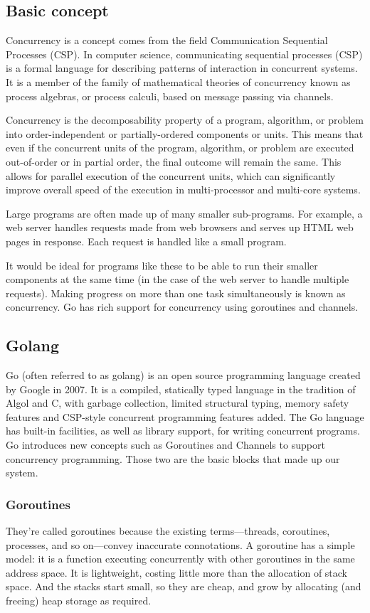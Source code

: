 \subsection{Basic concept}
Concurrency \cite{concurrency}is a concept comes from the field Communication Sequential Processes (CSP)\cite{csp}. In computer science, communicating sequential processes (CSP) is a formal language for describing patterns of interaction in concurrent systems. It is a member of the family of mathematical theories of concurrency known as process algebras, or process calculi, based on message passing via channels. 

Concurrency is the decomposability property of a program, algorithm, or problem into order-independent or partially-ordered components or units. This means that even if the concurrent units of the program, algorithm, or problem are executed out-of-order or in partial order, the final outcome will remain the same. This allows for parallel execution of the concurrent units, which can significantly improve overall speed of the execution in multi-processor and multi-core systems.

Large programs are often made up of many smaller sub-programs. For example, a web server handles requests made from web browsers and serves up HTML web pages in response. Each request is handled like a small program.

It would be ideal for programs like these to be able to run their smaller components at the same time (in the case of the web server to handle multiple requests). Making progress on more than one task simultaneously is known as concurrency. Go has rich support for concurrency using goroutines and channels.

\subsection{Golang}
Go\cite{golang} (often referred to as golang) is an open source programming language created by Google in 2007. It is a compiled, statically typed language in the tradition of Algol and C, with garbage collection, limited structural typing, memory safety features and CSP-style concurrent programming features added. The Go language has built-in facilities, as well as library support, for writing concurrent programs. Go introduces new concepts such as Goroutines and Channels to support concurrency programming. Those two are the basic blocks that made up our system.

\subsubsection*{Goroutines}
They're called goroutines because the existing terms—threads, coroutines, processes, and so on—convey inaccurate connotations. A goroutine has a simple model: it is a function executing concurrently with other goroutines in the same address space. It is lightweight, costing little more than the allocation of stack space. And the stacks start small, so they are cheap, and grow by allocating (and freeing) heap storage as required.

